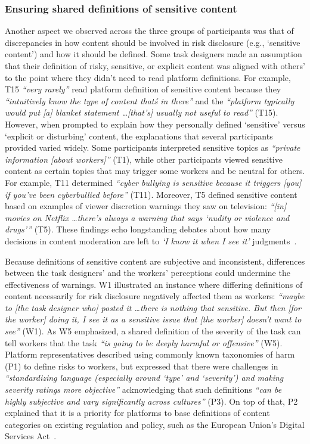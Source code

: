 \subsubsection{Ensuring shared definitions of sensitive
content}
Another aspect we observed across the three groups of participants was that of discrepancies in how content should be involved in risk disclosure (e.g., `sensitive content') and how it should be defined.
Some task designers made an assumption that their definition of risky, sensitive, or explicit content was aligned with others' to the point where they didn't need to read platform definitions. For example, T15 \textit{``very rarely''} read platform definition of sensitive content because they \textit{``intuitively know the type of content that\'s in there''} and the \textit{``platform typically would put [a] blanket statement \dots [that's] usually not useful to read''} (T15). However, when prompted to explain how they personally defined `sensitive' versus `explicit or disturbing' content, the explanations that several participants provided varied widely. Some participants interpreted sensitive topics as \textit{``private information [about workers]''} (T1), while other participants viewed sensitive content as certain topics that may trigger some workers and be neutral for others. For example, T11 determined \textit{``cyber bullying is sensitive because it triggers [you] if you've been cyberbullied before''} (T11). Moreover, T5 defined sensitive content based on examples of viewer discretion warnings they saw on television: \textit{``[in] movies on Netflix \dots there's always a warning that says `nudity or violence and drugs'''} (T5). These findings echo longstanding debates about how many decisions in content moderation are left to \textit{`I know it when I see it'} judgments~\cite{gillespie2020expanding, ohioknow}.

Because definitions of sensitive content are subjective and inconsistent, differences between the task designers' and the workers' perceptions could undermine the effectiveness of warnings. 
W1 illustrated an instance where differing definitions of content necessarily for risk disclosure negatively affected them as workers: \textit{``maybe to [the task designer who] posted it \dots there is nothing that sensitive. But then [for the worker] doing it, I see it as a sensitive issue that [the worker] doesn't want to see''} (W1). As W5 emphasized, a shared definition of the severity of the task can tell workers that the task \textit{``is going to be deeply harmful or offensive''} (W5). Platform representatives described using commonly known taxonomies of harm (P1) to define risks to workers, but expressed that there were challenges in \textit{``standardizing language (especially around `type' and `severity') and making severity ratings more objective''} acknowledging that such definitions \textit{``can be highly subjective and vary significantly across cultures''} (P3). On top of that, P2 explained that it is a priority for platforms to base definitions of content categories on existing regulation and policy, such as the European Union's Digital Services Act~\cite{EU-DSA-2022}.


